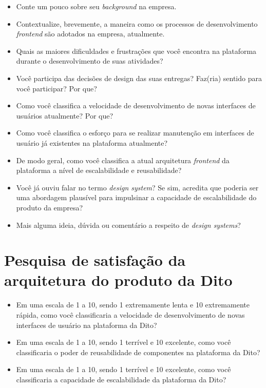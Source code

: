 \begin{anexosenv}
\begin{itemize}
  \item Conte um pouco sobre seu \textit{background} na empresa.
  \item Contextualize, brevemente, a maneira como os processos de desenvolvimento \textit{frontend} são adotados na empresa, atualmente.
  \item Quais as maiores dificuldades e frustrações que você encontra na plataforma durante o desenvolvimento de suas atividades?
  \item Você participa das decisões de design das suas entregas? Faz(ria) sentido para você participar? Por que?
  \item Como você classifica a velocidade de desenvolvimento de novas interfaces de usuários atualmente? Por que?
  \item Como você classifica o esforço para se realizar manutenção em interfaces de usuário já existentes na plataforma atualmente?
  \item De modo geral, como você classifica a atual arquitetura \textit{frontend} da plataforma a nível de escalabilidade e reusabilidade?
  \item Você já ouviu falar no termo \textit{design system}? Se sim, acredita que poderia ser uma abordagem plausível para impulsinar a capacidade de escalabilidade do produto da empresa?
  \item Mais alguma ideia, dúvida ou comentário a respeito de \textit{design systems}?
\end{itemize}


\chapter{Pesquisa de satisfação da arquitetura do produto da Dito}
\label{chap:anexoC}

\begin{itemize}
	\item Em uma escala de 1 a 10, sendo 1 extremamente lenta e 10 extremamente rápida, como você classificaria a velocidade de desenvolvimento de novas interfaces de usuário na plataforma da Dito?
	\item Em uma escala de 1 a 10, sendo 1 terrível e 10 excelente, como você classificaria o poder de reusabilidade de componentes na plataforma da Dito?
	\item Em uma escala de 1 a 10, sendo 1 terrível e 10 excelente, como você classificaria a capacidade de escalabilidade da plataforma da Dito?
\end{itemize}

\end{anexosenv}
